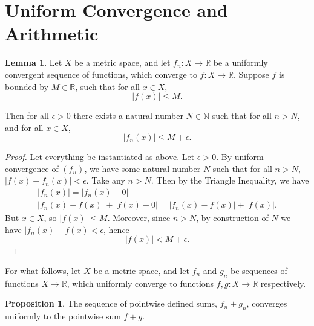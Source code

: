 \documentclass[12pt]{article}
\newcommand{\R}{\mathbb{R}}
\newcommand{\N}{\mathbb{N}}
\theoremstyle{definition}
\newtheorem{proposition}{Proposition}
\newtheorem{lemma}{Lemma}
\begin{document}
\section{Uniform Convergence and Arithmetic}

\begin{lemma}
 Let $X$ be a metric space, and let $f_n:X\to \R$ be a uniformly convergent sequence of functions, which converge to $f:X\to \R$. Suppose 
$f$ is bounded by $M\in \R$, such that for all $x\in X$, 
\[
	|f(x)| \le M.
\]

Then for all $\epsilon > 0 $ there exists a natural number $N\in \N$ such that for all $n> N$, and for all $x\in X$, 
\[
	|f_n(x)| \le M + \epsilon.
\]

\end{lemma}

\begin{proof} Let everything be instantiated as above. Let $\epsilon > 0$. By uniform convergence of $(f_n)$, we have some natural number $N$ such 
that for all $n > N$, $ |f(x) - f_n(x)| < \epsilon $. Take any $n> N$. Then by the Triangle Inequality, we have
\begin{equation}
	\begin{split}
		|f_n(x)| = |f_n(x) - 0| \\
		|f_n(x) - f(x)| + |f(x) - 0| = |f_n(x) - f(x)| + |f(x)|.
	\end{split}
\end{equation}
But $ x\in X $, so $ |f(x)| \le M $. Moreover, since $n> N$, by construction of $N$ we have $ |f_n(x) - f(x) <\epsilon$, hence
\[
|f(x)| < M + \epsilon.
\]

 \end{proof}

For what follows, let $X$ be a metric space, and let $f_n$ and $g_n$ be sequences of functions $ X\to \R $, which uniformly converge to functions 
$f,g:X\to \R$ respectively.

\begin{proposition}
The sequence of pointwise defined sums, $ f_n+g_n $, converges uniformly to the pointwise sum $f+g$.
\end{proposition}
\end{document}
